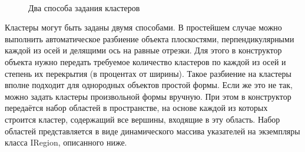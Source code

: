 \documentclass[a4paper, 14pt, titlepage]{extarticle}
\begin{document}
        \begin{figure}[!htb]
          \centering
          \hspace{0.1\textwidth}
          \\
          \caption{Два способа задания кластеров}
          \label{fig:clusters}
        \end{figure}

        Кластеры могут быть заданы двумя способами. В простейшем случае можно выполнить автоматическое
        разбиение объекта плоскостями, перпендикулярными каждой из осей и делящими ось на равные
        отрезки. Для этого в конструктор объекта нужно передать требуемое количество кластеров по
        каждой из осей и степень их перекрытия (в процентах от ширины). Такое разбиение на кластеры
        вполне подходит для однородных объектов простой формы. Если же это не так, можно задать
        кластеры произвольной формы вручную. При этом в конструктор передаётся набор областей в
        пространстве, на основе каждой из которых строится кластер, содержащий все вершины, входящие
        в эту область. Набор областей представляется в виде динамического массива указателей на
        экземпляры класса IRegion, описанного ниже.
\end{document}
